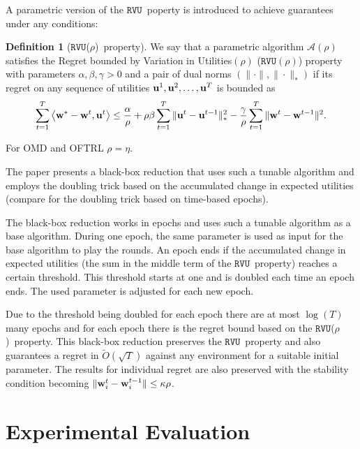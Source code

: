 \documentclass[a4paper]{article}
\theoremstyle{definition}
\newtheorem{defn}[theorem]{Definition}
\newcommand{\myprop}{\ensuremath{\texttt{RVU}}}
\newcommand{\mst}{\ensuremath{w}}
\newcommand{\A}{\ensuremath{\mathcal{A}}}
\newcommand{\stable}{\ensuremath{\kappa}}
\newcommand{\knob}{\ensuremath{\rho}}
\renewcommand{\vec}[1]{\ensuremath{{\bf #1}}}
\newcommand{\dotp}[2]{\ensuremath{\left\langle #1, #2 \right\rangle}}
\begin{document}
A parametric version of the \myprop~poperty is introduced to  achieve
guarantees under any conditions:

\begin{defn}[\myprop(\knob)~property]
  We say that a parametric algorithm $\A(\knob)$ satisfies the Regret
  bounded by Variation in Utilities$(\knob)$ ($\myprop(\knob)$)
  property with parameters $\alpha, \beta, \gamma > 0$ and a pair of
  dual norms $(\|\cdot\|, \|\cdot\|_*)$ if its regret on any sequence
  of utilities $\vec{u}^1, \vec{u}^2, \ldots, \vec{u}^T$ is bounded
  as \begin{equation*} \sum_{t=1}^{T} \dotp{\vec{w}^*- \vec{w}^t}{\vec{u}^t} \leq \frac{\alpha}{\knob}
  +\knob\beta \sum_{t=1}^{T} \| \vec{u}^t - \vec{u}^{t-1}\|_*^2
  - \frac{\gamma}{\knob}\sum_{t=1}^{T} \|\vec{w}^{t}
  - \vec{w}^{t-1}\|^2.  \label{eqn:reg-form-param} \end{equation*} \label{defn:alg-class-param}
\end{defn}

For OMD and OFTRL $ \knob = \eta$.

The paper presents a black-box reduction that uses such a tunable algorithm and employs
the doubling trick based on the accumulated change in
expected utilities (compare \cite[p.130]{Foundations} for the doubling
trick based on time-based epochs).

The black-box reduction works in epochs and uses such a tunable
algorithm as a base algorithm.
During one epoch, the same parameter is used as input for the base
algorithm to play the rounds.
An epoch ends if the accumulated change in expected utilities (the sum in the
middle term of the \myprop~property) reaches a certain threshold.
This threshold starts at one and is doubled each time an epoch ends.
The used parameter is adjusted for each new epoch.

Due to the threshold being doubled for each epoch there are at most $\log(T)$ many epochs and for
each epoch there is the regret bound based on the
\myprop(\knob)~property.
This black-box reduction preserves the \myprop~property and also
guarantees a regret in
$\tilde{O}(\sqrt{T})$ against any environment for a
suitable initial parameter.
The results for individual regret are also preserved with the stability
condition becoming $\|\vec{\mst}_i^t-\vec{\mst}_i^{t-1}\| \leq \stable\knob$.



\section{Experimental Evaluation}
\end{document}
